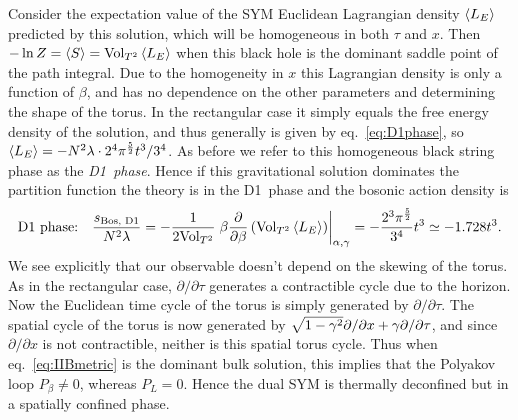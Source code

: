 Consider the expectation value of the SYM Euclidean Lagrangian density $\left\langle L_E \right\rangle$ predicted by this solution, which will be homogeneous in both $\tau$ and $x$.
Then $-\ln Z = \left\langle S \right\rangle = \text{Vol}_{T^2} \left\langle L_E \right\rangle$ when this black hole is the dominant saddle point of the path integral.
Due to the homogeneity in $x$ this Lagrangian density is only a function of $\beta$, and has no dependence on the other parameters \al and \ga determining the shape of the torus.
In the rectangular case it simply equals the free energy density of the solution, and thus generally is given by eq.~\eqref{eq:D1phase}, so $\left\langle L_E \right\rangle = -N^2 \lambda \cdot 2^4 \pi^{\frac{5}{2}} t^3 / 3^4$.
As before we refer to this homogeneous black string phase as the \emph{D1~phase}.
Hence if this gravitational solution dominates the partition function the theory is in the D1~phase and the bosonic action density is
\begin{equation}
  \label{eq:skewD1phase}
  \text{D1~phase:} \quad \frac{s_{\text{Bos, D1}}}{N^2 \lambda} = -\frac{1}{2 \text{Vol}_{T^2}} \left. \beta \frac{\partial }{\partial \beta} \left(\text{Vol}_{T^2} \left\langle L_E \right\rangle\right) \right|_{\alpha, \gamma} = -\frac{2^3 \pi^{\frac{5}{2}}}{3^4} t^3 \simeq -1.728t^3.
\end{equation}
We see explicitly that our observable doesn't depend on the skewing of the torus.
As in the rectangular case, $\partial / \partial \tau$ generates a contractible cycle due to the horizon.
Now the Euclidean time cycle of the torus is simply generated by $\partial / \partial \tau$.
The spatial cycle of the torus is now generated by $\sqrt{1 - \gamma^2} \partial / \partial x + \gamma \partial / \partial \tau$, and since $\partial / \partial x$ is not contractible, neither is this spatial torus cycle.
Thus when eq.~\eqref{eq:IIBmetric} is the dominant bulk solution, this implies that the Polyakov loop $P_{\beta} \ne 0$, whereas $P_L = 0$.
Hence the dual SYM is thermally deconfined but in a spatially confined phase.

